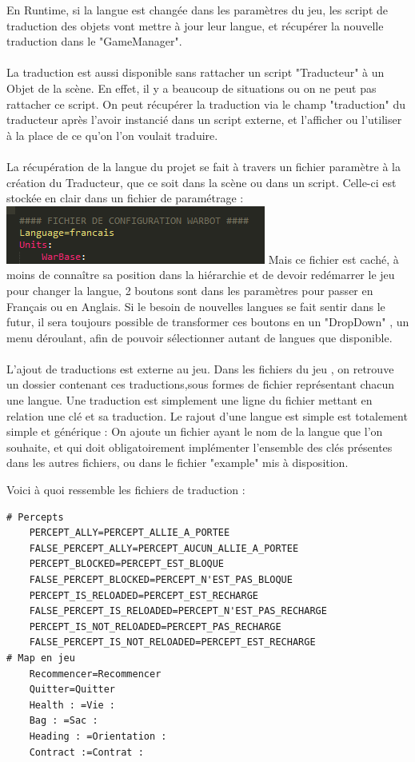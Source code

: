 \documentclass{report}
\begin{document}
En Runtime, si la langue est changée dans les paramètres du jeu, les script de traduction des objets vont mettre à jour leur langue, et récupérer la nouvelle traduction dans le "GameManager".
\paragraph{}
La traduction est aussi disponible sans rattacher un script "Traducteur" à un Objet de la scène.
En effet, il y a beaucoup de situations ou on ne peut pas rattacher ce script. On peut récupérer la traduction via le champ "traduction" du traducteur après l'avoir instancié dans un script externe, et l'afficher ou l'utiliser à la place de ce qu'on l'on voulait traduire.
\paragraph{}
La récupération de la langue du projet se fait à travers un fichier paramètre à la création du Traducteur, que ce soit dans la scène ou dans un script. 
Celle-ci est stockée en clair dans un fichier de paramétrage : 
\includegraphics{fichierconfig.png}
Mais ce fichier est caché, à moins de connaître sa position dans la hiérarchie et de devoir redémarrer le jeu pour changer la langue, 2 boutons sont dans les paramètres pour passer en Français ou en Anglais. Si le besoin de nouvelles langues se fait sentir dans le futur, il sera toujours possible de transformer ces boutons en un "DropDown" , un menu déroulant, afin de pouvoir sélectionner autant de langues que disponible.
\paragraph{}
L'ajout de traductions est externe au jeu. 
Dans les fichiers du jeu , on retrouve un dossier contenant ces traductions,sous formes de fichier représentant chacun une langue.
Une traduction est simplement une ligne du fichier mettant en relation une clé et sa traduction.
Le rajout d'une langue est simple est totalement simple et générique :
On ajoute un fichier ayant le nom de la langue que l'on souhaite, et qui doit obligatoirement implémenter l'ensemble des clés présentes dans les autres fichiers, ou dans le fichier "example" mis à disposition.

Voici à quoi ressemble les fichiers de traduction :
\begin{lstlisting}[language=XML]
# Percepts
	PERCEPT_ALLY=PERCEPT_ALLIE_A_PORTEE
	FALSE_PERCEPT_ALLY=PERCEPT_AUCUN_ALLIE_A_PORTEE
	PERCEPT_BLOCKED=PERCEPT_EST_BLOQUE
	FALSE_PERCEPT_BLOCKED=PERCEPT_N'EST_PAS_BLOQUE
	PERCEPT_IS_RELOADED=PERCEPT_EST_RECHARGE
	FALSE_PERCEPT_IS_RELOADED=PERCEPT_N'EST_PAS_RECHARGE
	PERCEPT_IS_NOT_RELOADED=PERCEPT_PAS_RECHARGE
	FALSE_PERCEPT_IS_NOT_RELOADED=PERCEPT_EST_RECHARGE
# Map en jeu 
	Recommencer=Recommencer
	Quitter=Quitter
	Health : =Vie : 
	Bag : =Sac : 
	Heading : =Orientation : 
	Contract :=Contrat :
\end{lstlisting}
\end{document}
